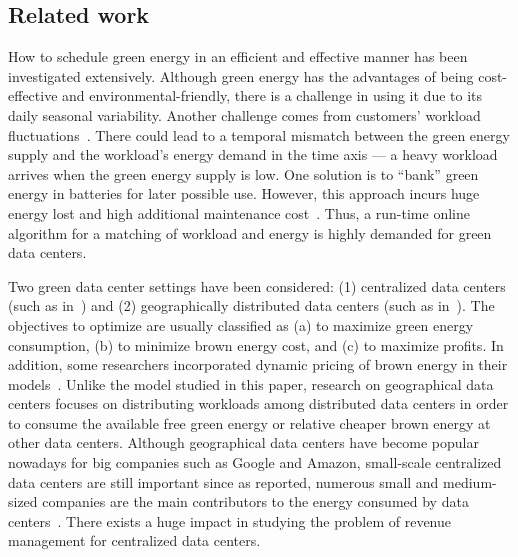 \documentclass[conference]{IEEEtran}
\begin{document}
\subsection{Related work}

How to schedule green energy in an efficient and effective manner has been investigated extensively. Although green energy has the advantages of being cost-effective and environmental-friendly, there is a challenge in using it due to its daily seasonal variability. Another challenge comes from customers' workload fluctuations~\cite{HeY10}. There could lead to a temporal mismatch between the green energy supply and the workload's energy demand in the time axis --- a heavy workload arrives when the green energy supply is low. One solution is to ``bank'' green energy in batteries for later possible use. However, this approach incurs huge energy lost and high additional maintenance cost~\cite{Bianchini12}. Thus, a run-time online algorithm for a matching of workload and energy is highly demanded for green data centers.

Two green data center settings have been considered: (1) centralized data centers (such as in~\cite{GoiriL11, Krioukov11, LiQ11}) and (2) geographically distributed data centers (such as in~\cite{LiuL11, LinL12}). The objectives to optimize are usually classified as (a) to maximize green energy consumption, (b) to minimize brown energy cost, and (c) to maximize profits. In addition, some researchers incorporated dynamic pricing of brown energy in their models~\cite{GoiriL11, RaoL10, LiuLLW14}. Unlike the model studied in this paper, research on geographical data centers focuses on distributing workloads among distributed data centers in order to consume the available free green energy or relative cheaper brown energy at other data centers. Although geographical data centers have become popular nowadays for big companies such as Google and Amazon, small-scale centralized data centers are still important since as reported, numerous small and medium-sized companies are the main contributors to the energy consumed by data centers~\cite{epa}. There exists a huge impact in studying the problem of revenue management for centralized data centers.
\end{document}
